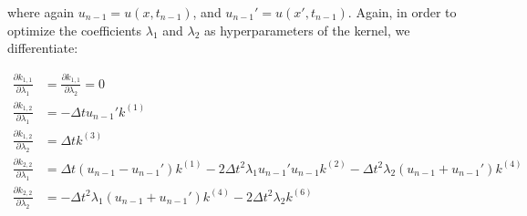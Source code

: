 \documentclass[]{article}
\begin{document}
where again $u_{n-1}=u(x,t_{n-1})$, and $u_{n-1}' = u(x',t_{n-1})$. Again, in order to optimize the coefficients $\lambda_1$ and $\lambda_2$ as hyperparameters of the kernel, we differentiate:

\begin{align*}
\frac{\partial k_{1,1}}{\partial\lambda_1} &= \frac{\partial k_{1,1}}{\partial\lambda_2} = 0\\
\frac{\partial k_{1,2}}{\partial\lambda_1} &= -\Delta t u_{n-1}'k^{(1)}\\
\frac{\partial k_{1,2}}{\partial\lambda_2} &= \Delta t k^{(3)}\\
\frac{\partial k_{2,2}}{\partial\lambda_1} &= \Delta t(u_{n-1}-u_{n-1}')k^{(1)} - 2\Delta t^2\lambda_1u_{n-1}'u_{n-1}k^{(2)} - \Delta t^2\lambda_2(u_{n-1}+u_{n-1}')k^{(4)}\\
\frac{\partial k_{2,2}}{\partial\lambda_2} &= -\Delta t^2\lambda_1(u_{n-1}+u_{n-1}')k^{(4)} - 2\Delta t^2\lambda_2 k^{(6)}
\end{align*}
\end{document}
